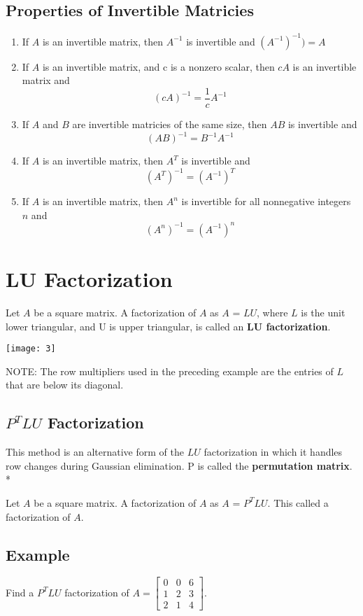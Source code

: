 \subsection*{Properties of Invertible Matricies}
\begin{enumerate}[a]
    \item If $A$ is an invertible matrix, then $A^{-1}$ is invertible and $(A^{-1})^{-1}) = A$
    \item If $A$ is an invertible matrix, and c is a nonzero scalar, then $cA$ is an invertible matrix and $$(cA)^{-1} = \frac{1}{c}A^{-1}$$
    \item If $A$ and $B$ are invertible matricies of the same size, then $AB$ is invertible and $$(AB)^{-1} = B^{-1}A^{-1}$$
    \item If $A$ is an invertible matrix, then $A^T$ is invertible and $$(A^T)^{-1} = (A^{-1})^T$$
    \item If $A$ is an invertible matrix, then $A^n$ is invertible for all nonnegative integers $n$ and $$(A^n)^{-1} = (A^{-1})^n$$
\end{enumerate}

\section{LU Factorization}
Let $A$ be a square matrix. A factorization of $A$ as $A$ = $LU$, where $L$ is the unit lower triangular, and U is upper triangular, is called an \textbf{LU factorization}.

\texttt{[image: 3]}

NOTE: The row multipliers used in the preceding example are the entries of $L$ that are below its diagonal.

\subsection*{$P^TLU$ Factorization}
This method is an alternative form of the $LU$ factorization in which it handles row changes during Gaussian elimination. P is called the \textbf{permutation matrix}.\\*

Let $A$ be a square matrix. A factorization of $A$ as $A$ = $P^TLU$. This called a factorization of $A$.
\subsection*{Example}
Find a $P^TLU$ factorization of $A = \begin{bmatrix}
    0&0&6\\1&2&3\\2&1&4
\end{bmatrix}$.
